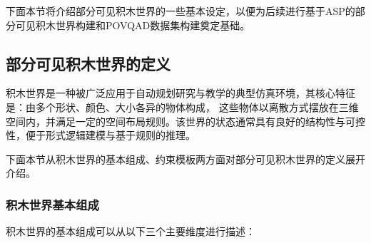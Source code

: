 下面本节将介绍部分可见积木世界的一些基本设定，以便为后续进行基于ASP的部分可见积木世界构建和POVQAD数据集构建奠定基础。
\subsection{部分可见积木世界的定义}
积木世界是一种被广泛应用于自动规划研究与教学的典型仿真环境，其核心特征是：由多个形状、颜色、大小各异的物体构成，
这些物体以离散方式摆放在三维空间内，并满足一定的空间布局规则。该世界的状态通常具有良好的结构性与可控性，便于形式逻辑建模与基于规则的推理。

下面本节从积木世界的基本组成、约束模板两方面对部分可见积木世界的定义展开介绍。
\subsubsection{积木世界基本组成}
积木世界的基本组成可以从以下三个主要维度进行描述：
